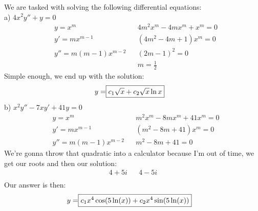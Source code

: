 \documentclass{article}
\begin{document}
\setcounter{subsection}{7}
\setcounter{subsubsection}{0}
\subsubsection{}
We are tasked with solving the following differential equations: \\
a) $4x^2y'' + y= 0$
\begin{align*}
    &  y = x^m  && 4m^2x^m-4mx^m+x^m = 0\\
    & y' = mx^{m-1} && (4m^2 -4m + 1)x^m = 0\\
    & y'' = m(m-1)x^{m-2} && (2m - 1)^2 = 0 \\
    & && m = \frac{1}{2}
\end{align*}
Simple enough, we end up with the solution:
\begin{align*}
    y = \Aboxed{c_1\sqrt{x}+c_2\sqrt{x}\ln{x}}
\end{align*}
b) $ x^2y'' - 7xy' + 41y = 0$
\begin{align*}
    &  y = x^m  && m^2x^m -8mx^m + 41x^m = 0\\
    & y' = mx^{m-1} && (m^2 - 8m + 41)x^m = 0\\
    & y'' = m(m-1)x^{m-2} && m^2 - 8m + 41 = 0
\end{align*}
We're gonna throw that quadratic into a calculator because I'm out of time, we get our roots and then our solution:
\begin{align*}
    4+5i && 4-5i\\
\end{align*}
Our answer is then:
\begin{align*}
    y = \Aboxed{c_1x^4\cos(5\ln(x)) + c_2x^4\sin(5\ln(x))}
\end{align*}
\end{document}

